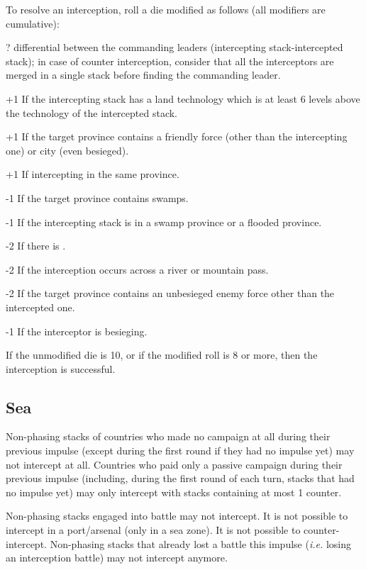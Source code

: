 To resolve an interception, roll a die modified as follows (all modifiers are
cumulative):
\begin{modlist}
\item[\textplusminus?] \Man differential between the commanding leaders
  (intercepting stack-intercepted stack); in case of counter interception,
  consider that all the interceptors are merged in a single stack before
  finding the commanding leader.
\item[+1] If the intercepting stack has a land technology which is at least 6
  levels above the technology of the intercepted stack.
\item[+1] If the target province contains a friendly force (other than the
  intercepting one) or city (even besieged).
\item[+1] If intercepting in the same province.
\item[-1] If the target province contains swamps.
\item[-1] If the intercepting stack is in a swamp province or a flooded
  province.
\item[-2] If there is .
\item[-2] If the interception occurs across a river or mountain pass.
\item[-2] If the target province contains an unbesieged enemy force other than
  the intercepted one.
\item[-1] If the interceptor is besieging.
\end{modlist}

If the unmodified die is 10, or if the modified roll is 8 or more, then the
interception is successful.

\subsection{Sea}
Non-phasing stacks of countries who made no campaign at all during their
previous impulse (except during the first round if they had no impulse yet)
may not intercept at all. Countries who paid only a passive campaign during
their previous impulse (including, during the first round of each turn, stacks
that had no impulse yet) may only intercept with stacks containing at most 1
\FLEET counter.

Non-phasing stacks engaged into battle may not intercept. It is not possible
to intercept in a port/arsenal (only in a sea zone). It is not possible to
counter-intercept. Non-phasing stacks that already lost a battle this impulse
(\emph{i.e.} losing an interception battle) may not intercept anymore.


